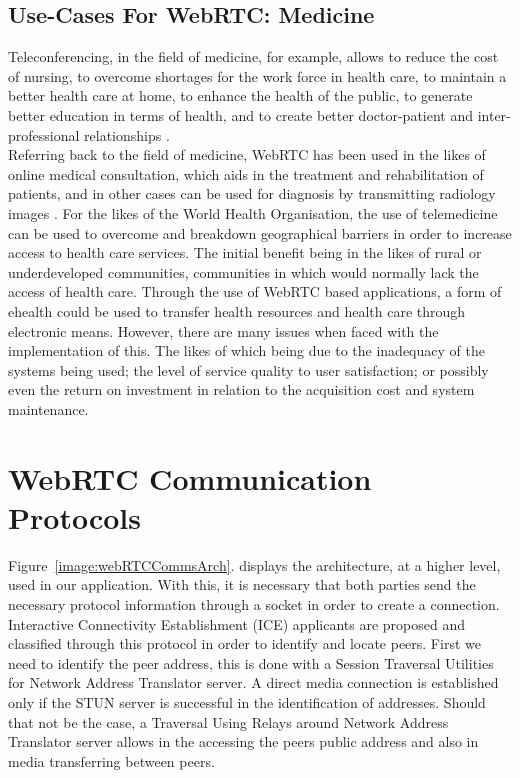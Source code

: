 \subsection{Use-Cases For WebRTC: Medicine}
Teleconferencing, in the field of medicine, for example, allows to reduce the cost of nursing, to overcome shortages for the work force in health care, to maintain a better health care at home, to enhance the health of the public, to generate better education in terms of health, and to create better doctor-patient and inter-professional relationships \cite{14003034520191201}. 
\\Referring back to the field of medicine, WebRTC has been used in the likes of online medical consultation, which aids in the treatment and rehabilitation of patients, and in other cases can be used for diagnosis by transmitting radiology images \cite{14003034520191201}. For the likes of the World Health Organisation, the use of telemedicine can be used to overcome and breakdown geographical barriers in order to increase access to health care services. The initial benefit being in the likes of rural or underdeveloped communities, communities in which would normally lack the access of health care. Through the use of WebRTC based applications, a form of ehealth could be used to transfer health resources and health care through electronic means. However, there are many issues when faced with the implementation of this. The likes of which being due to the inadequacy of the systems being used; the level of service quality to user satisfaction; or possibly even the return on investment in relation to the acquisition cost and system maintenance. \cite{S187705091632345620160101}

\section{WebRTC Communication Protocols}
Figure~\ref{image:webRTCCommsArch}. displays the architecture, at a higher level, used in our application. With this, it is necessary that both parties send the necessary protocol information through a socket in order to create a connection. Interactive Connectivity Establishment (ICE) applicants are proposed and classified through this protocol in order to identify and locate peers. First we need to identify the peer address, this is done with a Session Traversal Utilities for Network Address Translator server. A direct media connection is established only if the STUN server is successful in the identification of addresses. Should that not be the case, a Traversal Using Relays around Network Address Translator server allows in the accessing the peers public address and also in media transferring between peers\cite{14003034520191201}.

